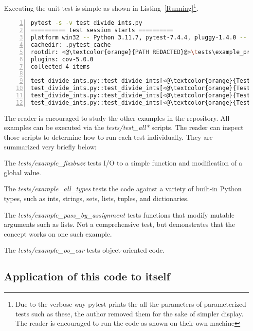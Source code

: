 \documentclass[10pt, conference]{IEEEtran}
\begin{document}
Executing the unit test is simple as shown in Listing~\ref{Running}\footnote{Due to the verbose way pytest prints the 
all the parameters of  parameterized tests such as these, the author removed
them for the sake of simpler display.  The reader is encouraged to run the code 
as shown on their own machine}.

\begin{lstlisting}[language=bash, numbers=left, caption={Running}]
pytest -s -v test_divide_ints.py
========== test session starts ==========
platform win32 -- Python 3.11.7, pytest-7.4.4, pluggy-1.4.0 -- <@\textcolor{orange}{PATH REDACTED}@>\.venv\Scripts\python.exe
cachedir: .pytest_cache
rootdir: <@\textcolor{orange}{PATH REDACTED}@>\tests\example_procedural_division
plugins: cov-5.0.0
collected 4 items

test_divide_ints.py::test_divide_ints[<@\textcolor{orange}{Test \#1 arguments SNIPPED}@>] <@\textcolor{green}{PASSED}@>
test_divide_ints.py::test_divide_ints[<@\textcolor{orange}{Test \#2 arguments SNIPPED}@>] <@\textcolor{green}{PASSED}@>
test_divide_ints.py::test_divide_ints[<@\textcolor{orange}{Test \#3 arguments SNIPPED}@>] <@\textcolor{green}{PASSED}@>
test_divide_ints.py::test_divide_ints[<@\textcolor{orange}{Test \#4 arguments SNIPPED}@>] <@\textcolor{green}{PASSED}@>
\end{lstlisting}

The reader is encouraged to study the other examples in the repository.
All examples can be executed via the 
\textit{tests/test\_all*} scripts.  The reader can inspect those scripts
to determine how to run each test individually. 
They are summarized very briefly below:

The \textit{tests/example\_fizzbuzz} tests I/O to a simple function and modification of a 
global value.

The \textit{tests/example\_all\_types} tests
the code against a variety of built-in Python types, 
such as ints, strings, sets, lists, tuples, and dictionaries.

The \textit{tests/example\_pass\_by\_assignment} tests
functions that modify mutable arguments such as lists. Not a comprehensive test,
but demonstrates that the concept works on one such example.

The \textit{tests/example\_oo\_car} tests object-oriented code. 
\subsection{Application of this code to itself}\label{sec:eval-2}
\end{document}
